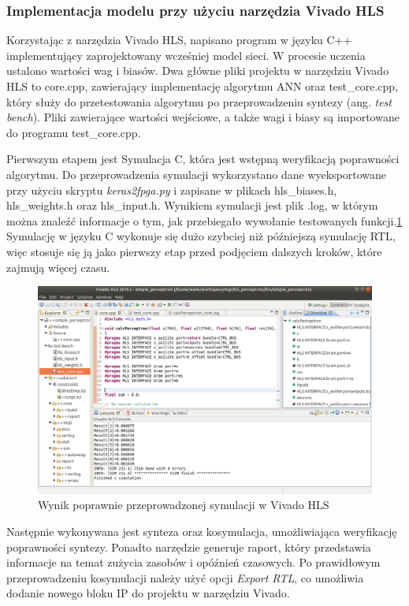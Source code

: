 \subsubsection{Implementacja modelu przy użyciu narzędzia Vivado HLS}

Korzystając z narzędzia Vivado HLS, napisano program w języku C++ implementujący 
zaprojektowany wcześniej model sieci. W procesie uczenia ustalono wartości wag i 
biasów. Dwa główne pliki projektu w narzędziu Vivado HLS to core.cpp, zawierający 
implementację algorytmu ANN oraz test\_core.cpp, który służy do przetestowania
algorytmu po przeprowadzeniu syntezy (ang. \emph{test bench}).   
Pliki zawierające wartości wejściowe, a także wagi i biasy są importowane 
do programu test\_core.cpp. 

Pierwszym etapem jest Symulacja C, która jest wstępną weryfikacją poprawności
algorytmu. Do przeprowadzenia symulacji wykorzystano dane wyeksportowane przy użyciu 
skryptu \emph{keras2fpga.py} i zapisane w plikach hls\_biases.h, hls\_weights.h oraz 
hls\_input.h. Wynikiem symulacji jest plik .log, w którym można znaleźć informacje o
tym, jak przebiegało wywołanie testowanych funkcji.\ref{hls_design_sim}
Symulację w języku C wykonuje się dużo szybciej niż późniejszą symulację RTL, więc
stosuje się ją jako pierwszy etap przed podjęciem dalszych kroków, które zajmują 
więcej czasu.

\begin{figure}[!h]
  \centering
  \includegraphics[width=\textwidth]{img/vivado_hls_sim.png}
  \caption{Wynik poprawnie przeprowadzonej symulacji w Vivado HLS}
  \label{hls_design_sim}
\end{figure}


Następnie wykonywana jest synteza oraz kosymulacja, umożliwiająca 
weryfikację poprawności syntezy. Ponadto narzędzie generuje raport, który przedstawia
informacje na temat zużycia zasobów i opóźnień czasowych. Po prawidłowym 
przeprowadzeniu kosymulacji należy użyć opcji \emph{Export RTL}, co umożliwia 
dodanie nowego bloku IP do projektu w narzędziu Vivado.

